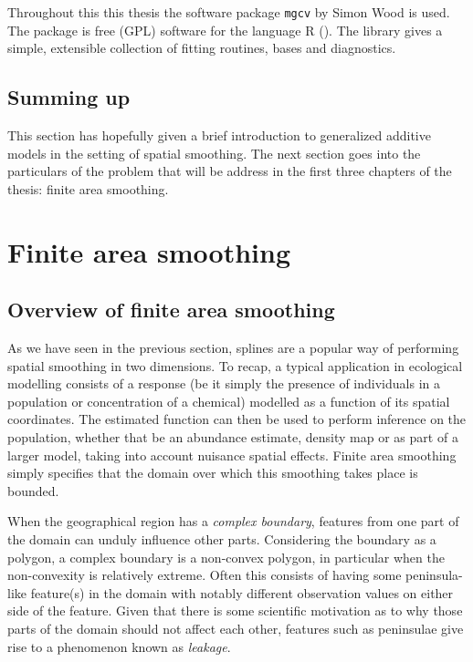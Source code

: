 Throughout this this thesis the software package \texttt{mgcv} by Simon Wood is used. The package is free (GPL) software for the language \textsf{R} (\cite{Rsoftware}). The library gives a simple, extensible collection of fitting routines, bases and diagnostics.


\subsection{Summing up}

This section has hopefully given a brief introduction to generalized additive models in the setting of spatial smoothing. The next section goes into the particulars of the problem that will be address in the first three chapters of the thesis: finite area smoothing.


\section{Finite area smoothing}
\label{intro-FAS}

\subsection{Overview of finite area smoothing}

As we have seen in the previous section, splines are a popular way of performing spatial smoothing in two dimensions. To recap, a typical application in ecological modelling consists of a response (be it simply the presence of individuals in a population or concentration of a chemical) modelled as a function of its spatial coordinates. The estimated function can then be used to perform inference on the population, whether that be an abundance estimate, density map or as part of a larger model, taking into account nuisance spatial effects. Finite area smoothing simply specifies that the domain over which this smoothing takes place is bounded.

When the geographical region has a \emph{complex boundary}, features from one part of the domain can unduly influence other parts. Considering the boundary as a polygon, a complex boundary is a non-convex polygon, in particular when the non-convexity is relatively extreme. Often this consists of having some peninsula-like feature(s) in the domain with notably different observation values on either side of the feature. Given that there is some scientific motivation as to why those parts of the domain should not affect each other, features such as peninsulae give rise to a phenomenon known as \emph{leakage}.

